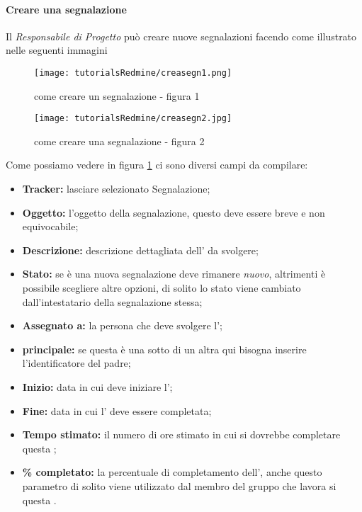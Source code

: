 \documentclass{scalatekids-article}
\begin{document}
\paragraph{Creare una segnalazione}
Il \textit{Responsabile di Progetto} può creare nuove segnalazioni facendo come illustrato nelle seguenti immagini
\begin{figure}[H]
  \centering
  \texttt{[image: tutorialsRedmine/creasegn1.png]}
  \caption{come creare un segnalazione - figura 1}
\end{figure}
\begin{figure}[H]
  \centering
  \texttt{[image: tutorialsRedmine/creasegn2.jpg]}
  \caption{come creare una segnalazione - figura 2\label{fig:crea-segnalazione-2}}
\end{figure}
Come possiamo vedere in figura \ref{fig:crea-segnalazione-2} ci sono diversi campi da compilare:
\begin{itemize}
\item \textbf{Tracker:} lasciare selezionato Segnalazione;
\item \textbf{Oggetto:} l'oggetto della segnalazione, questo deve essere breve e non equivocabile;
\item \textbf{Descrizione:} descrizione dettagliata dell' da svolgere;
\item \textbf{Stato:} se è una nuova segnalazione deve rimanere \textit{nuovo}, altrimenti è possibile scegliere altre opzioni, di solito lo stato viene cambiato dall'intestatario della segnalazione stessa;
\item \textbf{Assegnato a:} la persona che deve svolgere l';
\item \textbf{ principale:} se questa è una sotto  di un altra qui bisogna inserire l'identificatore del  padre;
\item \textbf{Inizio:} data in cui deve iniziare l';
\item \textbf{Fine:} data in cui l' deve essere completata;
\item \textbf{Tempo stimato:} il numero di ore stimato in cui si dovrebbe completare questa ;
\item \textbf{\% completato:} la percentuale di completamento dell', anche questo parametro di solito viene utilizzato dal membro del gruppo che lavora si questa .
\end{itemize}
\end{document}
